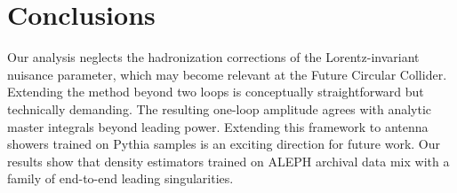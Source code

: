 \section{Conclusions}\label{sec:conclusions}

Our analysis neglects the hadronization corrections of the
Lorentz-invariant nuisance parameter, which may become relevant at the
Future Circular Collider. Extending the method beyond two loops is
conceptually straightforward but technically demanding. The resulting
one-loop amplitude agrees with analytic master integrals beyond leading
power. Extending this framework to antenna showers trained on Pythia
samples is an exciting direction for future work. Our results show that
density estimators trained on ALEPH archival data mix with a family of
end-to-end leading singularities.

